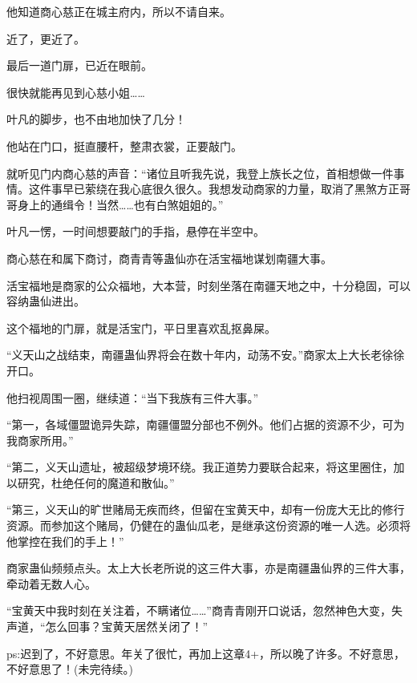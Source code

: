 \begin{this_body}
他知道商心慈正在城主府内，所以不请自来。

近了，更近了。

最后一道门扉，已近在眼前。

很快就能再见到心慈小姐……

叶凡的脚步，也不由地加快了几分！

他站在门口，挺直腰杆，整肃衣裳，正要敲门。

就听见门内商心慈的声音：“诸位且听我先说，我登上族长之位，首相想做一件事情。这件事早已萦绕在我心底很久很久。我想发动商家的力量，取消了黑煞方正哥哥身上的通缉令！当然……也有白煞姐姐的。”

叶凡一愣，一时间想要敲门的手指，悬停在半空中。

商心慈在和属下商讨，商青青等蛊仙亦在活宝福地谋划南疆大事。

活宝福地是商家的公众福地，大本营，时刻坐落在南疆天地之中，十分稳固，可以容纳蛊仙进出。

这个福地的门扉，就是活宝门，平日里喜欢乱抠鼻屎。

“义天山之战结束，南疆蛊仙界将会在数十年内，动荡不安。”商家太上大长老徐徐开口。

他扫视周围一圈，继续道：“当下我族有三件大事。”

“第一，各域僵盟诡异失踪，南疆僵盟分部也不例外。他们占据的资源不少，可为我商家所用。”

“第二，义天山遗址，被超级梦境环绕。我正道势力要联合起来，将这里圈住，加以研究，杜绝任何的魔道和散仙。”

“第三，义天山的旷世赌局无疾而终，但留在宝黄天中，却有一份庞大无比的修行资源。而参加这个赌局，仍健在的蛊仙瓜老，是继承这份资源的唯一人选。必须将他掌控在我们的手上！”

商家蛊仙频频点头。太上大长老所说的这三件大事，亦是南疆蛊仙界的三件大事，牵动着无数人心。

“宝黄天中我时刻在关注着，不瞒诸位……”商青青刚开口说话，忽然神色大变，失声道，“怎么回事？宝黄天居然关闭了！”

ps:迟到了，不好意思。年关了很忙，再加上这章4+，所以晚了许多。不好意思，不好意思了！(未完待续。)

\end{this_body}

